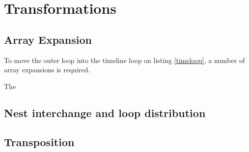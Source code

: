 \section{Transformations}

\subsection{Array Expansion}
To move the outer loop into the timeline loop on listing \ref{timeloop}, a number of array expansions is required.



The 

\subsection{Nest interchange and loop distribution}

\subsection{Transposition}


